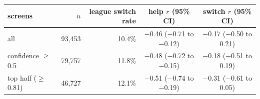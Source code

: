 \begin{tabular}{lrrcc}
\hline
screens & $n$ & league switch rate & help $r$ (95\% CI) & switch $r$ (95\% CI) \\
\hline
all & 93,453 & 10.4\% & $-$0.46 ($-$0.71 to $-$0.12) & $-$0.17 ($-$0.50 to 0.21) \\
confidence $\geq$ 0.5 & 79,757 & 11.8\% & $-$0.48 ($-$0.72 to $-$0.15) & $-$0.18 ($-$0.51 to 0.19) \\
top half ($\geq$ 0.81) & 46,727 & 12.1\% & $-$0.51 ($-$0.74 to $-$0.19) & $-$0.31 ($-$0.61 to 0.05) \\
\hline
\end{tabular}
